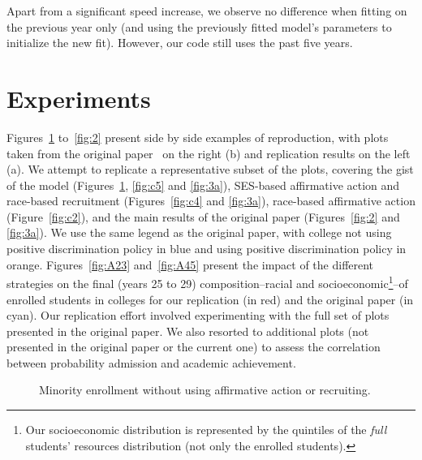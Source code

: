 Apart from a significant speed increase, we observe no difference when fitting on the previous year only (and using the previously fitted model's parameters to initialize the new fit). 
However, our code still uses the past five years.

\section{Experiments}

Figures~\ref{fig:c1} to~\ref{fig:2} present side by side examples of reproduction, with plots taken from the original paper~\cite{reardon2018levels} on the right (b) and replication results on the left (a).
We attempt to replicate a representative subset of the plots, covering the gist of the model (Figures~\ref{fig:c1}, \ref{fig:c5} and \ref{fig:3a}), SES-based affirmative action and race-based recruitment (Figures~\ref{fig:c4} and \ref{fig:3a}), race-based affirmative action (Figure~\ref{fig:c2}), and the main results of the original paper (Figures~\ref{fig:2}  and \ref{fig:3a}). We use the same legend as the original paper, with college not using positive discrimination policy in \colorbox{sns-blue}{blue} and using positive discrimination policy in \colorbox{sns-orange}{orange}.
Figures~\ref{fig:A23} and~\ref{fig:A45} present the impact of the different strategies on the final (years 25 to 29) composition--racial and socioeconomic\footnote{Our socioeconomic distribution is represented by the quintiles of the \emph{full} students' resources distribution (not only the enrolled students).}--of enrolled students in colleges for our replication (in \colorbox{sns-red}{red}) and the original paper (in \colorbox{sns-cyan}{cyan}).
Our replication effort involved experimenting with the full set of plots presented in the original paper. 
We also resorted to additional plots (not presented in the original paper or the current one) to assess the correlation between probability admission and academic achievement.

\begin{figure}
  \centering
  \hfill%
  \caption{Minority enrollment without using affirmative action or recruiting.}
  \label{fig:c1}
\end{figure}

